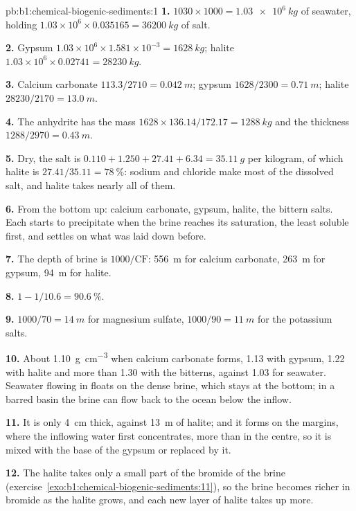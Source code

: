 \begin{solution}{pb:b1:chemical-biogenic-sediments:1}
\textbf{1.} $1030\times1000 = \qty{1.03e6}{kg}$ of seawater, holding
$1.03\times10^6\times0.035165 = \qty{36200}{kg}$ of salt.

\textbf{2.} Gypsum $1.03\times10^6\times1.581\times10^{-3} = \qty{1628}{kg}$;
halite $1.03\times10^6\times0.02741 = \qty{28230}{kg}$.

\textbf{3.} Calcium carbonate $113.3/2710 = \qty{0.042}{m}$; gypsum $1628/2300 =
\qty{0.71}{m}$; halite $28230/2170 = \qty{13.0}{m}$.

\textbf{4.} The anhydrite has the mass $1628\times136.14/172.17 =
\qty{1288}{kg}$ and the thickness $1288/2970 = \qty{0.43}{m}$.

\textbf{5.} Dry, the salt is $0.110 + 1.250 + 27.41 + 6.34 = \qty{35.11}{g}$ per
kilogram, of which halite is $27.41/35.11 = \qty{78}{\%}$: sodium and chloride
make most of the dissolved salt, and halite takes nearly all of them.

\textbf{6.} From the bottom up: calcium carbonate, gypsum, halite, the bittern
salts. Each  starts to precipitate when the brine reaches its
saturation, the least soluble first, and settles on what was laid down before.

\textbf{7.} The depth of brine is $1000/\mathrm{CF}$: \qty{556}{m} for calcium
carbonate, \qty{263}{m} for gypsum, \qty{94}{m} for halite.

\textbf{8.} $1 - 1/10.6 = \qty{90.6}{\%}$.

\textbf{9.} $1000/70 = \qty{14}{m}$ for magnesium sulfate, $1000/90 = \qty{11}{m}$
for the potassium salts.

\textbf{10.} About \qty{1.10}{g.cm^{-3}} when calcium carbonate forms, 1.13 with
gypsum, 1.22 with halite and more than 1.30 with the bitterns, against 1.03 for
seawater. Seawater flowing in floats on the dense brine, which stays at the
bottom; in a barred basin the brine can flow back to the ocean below the
inflow.

\textbf{11.} It is only \qty{4}{cm} thick, against \qty{13}{m} of halite; and it
forms on the margins, where the inflowing water first concentrates, more than in
the centre, so it is mixed with the base of the gypsum or replaced by it.

\textbf{12.} The halite takes only a small part of the bromide of the brine
(exercise~\ref{exo:b1:chemical-biogenic-sediments:11}), so the brine becomes
richer in bromide as the halite grows, and each new layer of halite takes up
more.


\end{solution}
